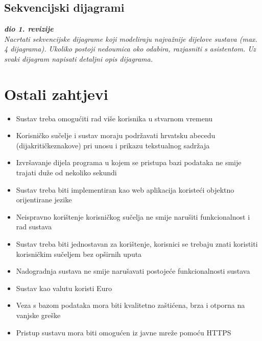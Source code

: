			\subsection{Sekvencijski dijagrami}
				
				\textbf{\textit{dio 1. revizije}}\\
				
				\textit{Nacrtati sekvencijske dijagrame koji modeliraju najvažnije dijelove sustava (max. 4 dijagrama). Ukoliko postoji nedoumica oko odabira, razjasniti s asistentom. Uz svaki dijagram napisati detaljni opis dijagrama.}
				\eject
	
		\section{Ostali zahtjevi}
			 
			\begin{itemize}
				\item Sustav treba omogućiti rad više korisnika u stvarnom vremenu
				\item Korisničko sučelje i sustav moraju podržavati hrvatsku abecedu (dijakritičkeznakove) pri unosu i prikazu tekstualnog sadržaja
				\item Izvršavanje dijela programa u kojem se pristupa bazi podataka ne smije trajati duže od nekoliko sekundi
				\item Sustav treba biti implementiran kao web aplikacija koristeći objektno orijentirane jezike
				\item Neispravno korištenje korisničkog sučelja ne smije narušiti funkcionalnost i rad sustava
				\item Sustav treba biti jednostavan za korištenje, korisnici se trebaju znati koristiti korisničkim sučeljem bez opširnih uputa
				\item Nadogradnja sustava ne smije narušavati postojeće funkcionalnosti sustava
				\item Sustav kao valutu koristi Euro
				\item Veza s bazom podataka mora biti kvalitetno zaštićena, brza i otporna na vanjske greške
				\item Pristup sustavu mora biti omogućen iz javne mreže pomoću HTTPS
			\end{itemize} 
			 
	